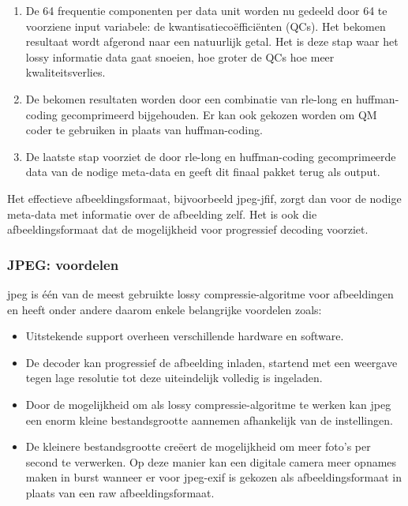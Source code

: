 \begin{enumerate}
	\item De 64 frequentie componenten per data unit worden nu gedeeld door 64 te voorziene input variabele: de kwantisatiecoëfficiënten (QCs). Het bekomen resultaat wordt afgerond naar een natuurlijk getal. Het is deze stap waar het \gls{lossy} informatie data gaat snoeien, hoe groter de QCs hoe meer kwaliteitsverlies.
	
	\item De bekomen resultaten worden door een combinatie van \gls{rle-long} en \gls{huffman-coding} gecomprimeerd bijgehouden. Er kan ook gekozen worden om QM coder te gebruiken in plaats van \gls{huffman-coding}.
	
	\item De laatste stap voorziet de door \gls{rle-long} en \gls{huffman-coding} gecomprimeerde data van de nodige \gls{meta-data} en geeft dit finaal pakket terug als output.

\end{enumerate}

Het effectieve afbeeldingsformaat, bijvoorbeeld \gls{jpeg-jfif}, zorgt dan voor de nodige \gls{meta-data} met informatie over de afbeelding zelf. Het is ook die \gls{afbeeldingsformaat} dat de mogelijkheid voor progressief \gls{decoding} voorziet.

\subsubsection{JPEG: voordelen}
\label{sec:afbeeldingscompressie-jpeg-voordelen}

\Gls{jpeg} is één van de meest gebruikte \gls{lossy} \gls{compressie-algoritme} voor afbeeldingen en heeft onder andere daarom enkele belangrijke voordelen zoals:

\begin{itemize}
	\item Uitstekende support overheen verschillende hardware en software.
	
	\item De  \gls{decoder} kan progressief de afbeelding inladen, startend met een weergave tegen lage resolutie tot deze uiteindelijk volledig is ingeladen.
	
	\item Door de mogelijkheid om als \gls{lossy} \gls{compressie-algoritme} te werken kan \gls{jpeg} een enorm kleine bestandsgrootte aannemen afhankelijk van de instellingen.
	
	\item De kleinere bestandsgrootte creëert de mogelijkheid om meer foto's per second te verwerken. Op deze manier kan een digitale camera meer opnames maken in burst wanneer er voor \gls{jpeg-exif} is gekozen als \gls{afbeeldingsformaat} in plaats van een \gls{raw} \gls{afbeeldingsformaat}. 
\end{itemize}

